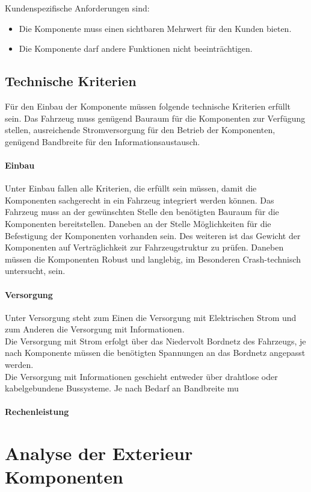 Kundenspezifische Anforderungen sind:
\begin{itemize}
	\item Die Komponente muss einen sichtbaren Mehrwert für den Kunden bieten.
	\item Die Komponente darf andere Funktionen nicht beeinträchtigen.
\end{itemize}
\subsection{Technische Kriterien}
Für den Einbau der Komponente müssen folgende technische Kriterien erfüllt sein. Das Fahrzeug muss genügend Bauraum für die Komponenten zur Verfügung stellen, ausreichende Stromversorgung für den Betrieb der Komponenten, genügend Bandbreite für den Informationsaustausch.
\paragraph{Einbau}
Unter Einbau fallen alle Kriterien, die erfüllt sein müssen, damit die Komponenten sachgerecht in ein Fahrzeug integriert werden können.
Das Fahrzeug muss an der gewünschten Stelle den benötigten Bauraum für die Komponenten bereitstellen. Daneben an der Stelle Möglichkeiten für die Befestigung der Komponenten vorhanden sein. Des weiteren ist das Gewicht der Komponenten auf Verträglichkeit zur Fahrzeugstruktur zu prüfen. Daneben müssen die Komponenten Robust und langlebig, im Besonderen Crash-technisch untersucht, sein.

\paragraph{Versorgung}
Unter Versorgung steht zum Einen die Versorgung mit Elektrischen Strom und zum Anderen die Versorgung mit Informationen.\\
Die Versorgung mit Strom erfolgt über das Niedervolt Bordnetz des Fahrzeugs, je nach Komponente müssen die benötigten Spannungen an das Bordnetz angepasst werden.\\
Die Versorgung mit Informationen geschieht entweder über drahtlose oder kabelgebundene Bussysteme.
Je nach Bedarf an Bandbreite mu
\paragraph{Rechenleistung}

\section{Analyse der Exterieur Komponenten}

